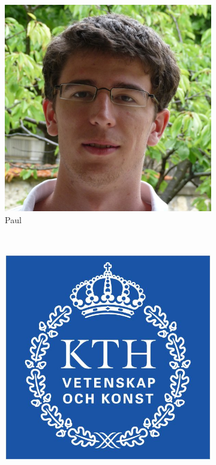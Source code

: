 \documentclass[a4paper,10pt]{article}
\begin{document}
\begin{titlepage}
\begin{center}
\begin{figure}[h]
\begin{subfigure}[b]{0.2\textwidth}
                \includegraphics[width=\textwidth]{paul.jpg}
                \caption{Paul}
                \label{fig:Paul}
        \end{subfigure}
        \\ %
        \begin{subfigure}[b]{0.2\textwidth}
                \centering
                \includegraphics[width=\textwidth]{kth_mathematics_rgb.jpg}

\end{subfigure}
\end{figure}
\end{center}
\end{titlepage}
\end{document}

